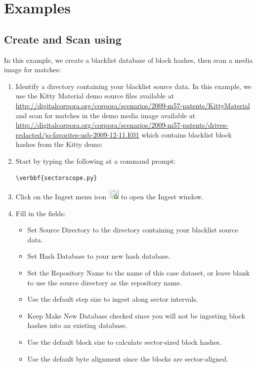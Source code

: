 \documentclass[11pt,fleqn]{article} %
\begin{document}
\section{Examples}
\subsection{Create and Scan using \sscope}
In this example, we create a blacklist database of block hashes, then scan a media image for matches:

\begin{enumerate}
\item Identify a directory containing your blacklist source data.
In this example, we use the Kitty Material demo source files available at \url{http://digitalcorpora.org/corpora/scenarios/2009-m57-patents/KittyMaterial} and scan for matches in the demo media image available at \url{http://digitalcorpora.org/corpora/scenarios/2009-m57-patents/drives-redacted/jo-favorites-usb-2009-12-11.E01} which contains blacklist block hashes from the Kitty demo:
\item Start \sscope by typing the following at a command prompt:
\begin{Verbatim}[commandchars=\\\{\}]
\verbbf{sectorscope.py}
\end{Verbatim} 
\item Click on the Ingest menu icon 
\includegraphics[scale=.4]{screenshots/ingest_menu_icon}
to open the \sscope Ingest window.
\item Fill in the fields:
  \begin{itemize}
  \item Set Source Directory to the directory containing your blacklist source data.
  \item Set Hash Database to your new hash database.
  \item Set the Repository Name to the name of this case dataset, or leave blank to use the source directory as the repository name.
  \item Use the default step size to ingest along sector intervals.
  \item Keep Make New Database checked since you will not be ingesting block hashes into an existing database.
  \item Use the default block size to calculate sector-sized block hashes.
  \item Use the default byte alignment since the blocks are sector-aligned.

\end{itemize}
\end{enumerate}
\end{document}
